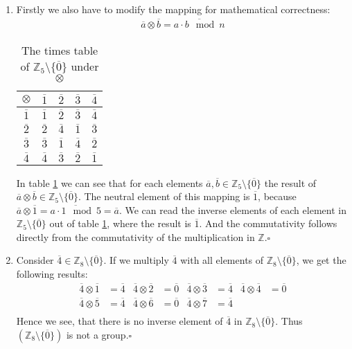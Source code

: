 \documentclass[solution]{tudexercise}
\newcommand{\qed}{\hspace*{\fill}$\square$}
\begin{document}
\begin{enumerate}
				\item
				Firstly we also have to modify the mapping for mathematical correctness:
				\begin{align}
\overline{a} \otimes \overline{b} = \overline{a \cdot b \mod n}
				\end{align}
				\begin{table}[h]
					\centering
					\caption{The times table of $\mathbb{Z}_5 \setminus \{\overline{0}\}$ under $\otimes$}
					\label{tab:timesTableZ5}
					\begin{tabular}{c|cccc}
$\otimes$ & $\overline{1}$ & $\overline{2}$ & $\overline{3}$ & $\overline{4}$\\\hline
$\overline{1}$ & $\overline{1}$ & $\overline{2}$ & $\overline{3}$ & $\overline{4}$\\
$\overline{2}$ & $\overline{2}$ & $\overline{4}$ & $\overline{1}$ & $\overline{3}$\\
$\overline{3}$ & $\overline{3}$ & $\overline{1}$ & $\overline{4}$ & $\overline{2}$\\
$\overline{4}$ & $\overline{4}$ & $\overline{3}$ & $\overline{2}$ & $\overline{1}$\\
					\end{tabular}
				\end{table}
				In table \ref{tab:timesTableZ5} we can see that for each elements $\overline{a}, \overline{b} \in \mathbb{Z}_5 \setminus \{\overline{0}\}$ the result of $\overline{a} \otimes \overline{b} \in \mathbb{Z}_5 \setminus \{\overline{0}\}$. The neutral element of this mapping is $\overline{1}$, because $\overline{a} \otimes \overline{1} = \overline{a \cdot 1 \mod 5} = \overline{a}$. We can read the inverse elements of each element in $\mathbb{Z}_5 \setminus \{\overline{0}\}$ out of table \ref{tab:timesTableZ5}, where the result is $\overline{1}$. And the commutativity follows directly from the commutativity of the multiplication in $\mathbb{Z}$.\qed
				
				\item
				Consider $\overline{4} \in \mathbb{Z}_8 \setminus \{\overline{0}\}$. If we multiply $\overline{4}$ with all elements of $\mathbb{Z}_8 \setminus \{\overline{0}\}$, we get the following results:
				\begin{align*}
\overline{4} \otimes \overline{1} &= \overline{4} & \overline{4} \otimes \overline{2} &= \overline{0} & \overline{4} \otimes \overline{3} &= \overline{4} & \overline{4} \otimes \overline{4} &= \overline{0}\\
\overline{4} \otimes \overline{5} &= \overline{4} & \overline{4} \otimes \overline{6} &= \overline{0} & \overline{4} \otimes \overline{7} &= \overline{4}\\
				\end{align*}
				Hence we see, that there is no inverse element of $\overline{4}$ in $\mathbb{Z}_8 \setminus \{\overline{0}\}$. Thus $(\mathbb{Z}_8 \setminus \{\overline{0}\})$ is not a group.\qed
				

\end{enumerate}
\end{document}
